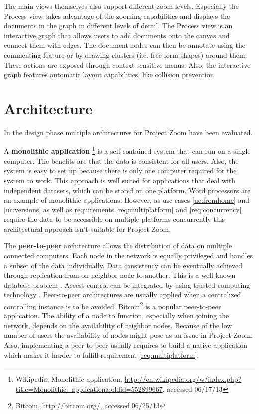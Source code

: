 The main views themselves also support different zoom levels. Especially the Process view takes advantage of the zooming capabilities and displays the documents in the graph in different levels of detail. 
The Process view is an interactive graph that allows users to add documents onto the canvas and connect them with edges. The document nodes can then be annotate using the commenting feature or by drawing clusters (i.e. free form shapes) around them. These actions are exposed through context-sensitive menus. Also, the interactive graph features automatic layout capabilities, like collision prevention.

\section{Architecture}
In the design phase multiple architectures for Project Zoom have been evaluated. 

A \textbf{monolithic application} \footnote{Wikipedia, Monolithic application, \url{http://en.wikipedia.org/w/index.php?title=Monolithic_application&oldid=552899667}, accessed 06/17/13} is a self-contained system that can run on a single computer. The benefits are that the data is consistent for all users. Also, the system is easy to set up because there is only one computer required for the system to work. This approach is well suited for applications that deal with independent datasets, which can be stored on one platform. Word processors are an example of monolithic applications. However, as use cases \ref{uc:fromhome} and \ref{uc:versions} as well as requirements \ref{req:multiplatform} and \ref{req:concurrency} require the data to be accessible on multiple platforms concurrently this architectural approach isn't suitable for Project Zoom.

The \textbf{peer-to-peer} \cite{Schollmeier_2001} architecture allows the distribution of data on multiple connected computers. Each node in the network is equally privileged and handles a subset of the data individually. Data consistency can be eventually achieved through replication from on neighbor node to another. This is a well-known database problem \cite{Gray_1996}. Access control can be integrated by using trusted computing technology \cite{Sandhu_2005}. Peer-to-peer architectures are usually applied when a centralized controlling instance is to be avoided. Bitcoin\footnote{Bitcoin, \url{http://bitcoin.org/}, accessed 06/25/13} is a popular peer-to-peer application. The ability of a node to function, especially when joining the network, depends on the availability of neighbor nodes. Because of the low number of users the availability of nodes might pose as an issue in Project Zoom. Also, implementing a peer-to-peer usually requires to build a native application which makes it harder to fulfill requirement \ref{req:multiplatform}.

